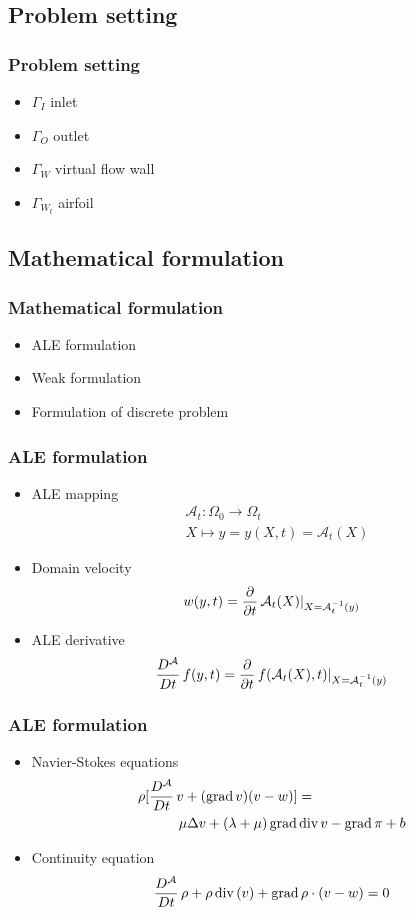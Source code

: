 \documentclass{beamer}
\begin{document}
\subsection{Problem setting}

\frame
{
	\frametitle{Problem setting}
	\begin{itemize}
		\item $\Gamma_I$ inlet
		\item $\Gamma_O$ outlet
		\item $\Gamma_W$ virtual flow wall
		\item $\Gamma_{W_t}$ airfoil
	\end{itemize}
}


\subsection{Mathematical formulation}

\frame
{
  	\frametitle{Mathematical formulation}
	\begin{itemize}
    	\item ALE formulation
    	\item Weak formulation
    	\item Formulation of discrete problem
	\end{itemize}
}

\frame
{
	\frametitle{ALE formulation}
	\begin{itemize}
		\item ALE mapping
			\[
			\begin{split}
			&\mathcal A_t:\Omega_0\rightarrow\Omega_t\\
			&X\mapsto y=y(X,t)=\mathcal A_t(X)
			\end{split}
			\]
		\pause
		\item Domain velocity
			$$w(y,t)=\frac{\partial}{\partial t}\, \mathcal A_t(X)|_{X=\mathcal A_t^{-1}(y)}$$
		\pause
	 		\item ALE derivative
			$$\frac{D^\mathcal A}{Dt}\, f(y,t) = \frac{\partial}{\partial t}\, f(\mathcal A_t(X),t)|_{X=\mathcal A_t^{-1}(y)}$$ 
	\end{itemize}
}

\frame
{
	\frametitle{ALE formulation}
	\begin{itemize}
    	\item Navier-Stokes equations
		\[
			\begin{split}
				\rho[\frac{D^\mathcal A}{Dt}\, v+(&\mbox{grad}\,v)(v-w)] = \\
					\mu\Delta v&+(\lambda+\mu)\,\mbox{grad}\,\mbox{div}\,v -\mbox{grad}\,\pi + b
			\end{split}
		\]
    	\item Continuity equation
		$$\frac{D^\mathcal A}{Dt}\, \rho+\rho\,\mbox{div}\,(v)+\mbox{grad}\,\rho \cdot (v-w) = 0$$
	\end{itemize}
}
\end{document}
